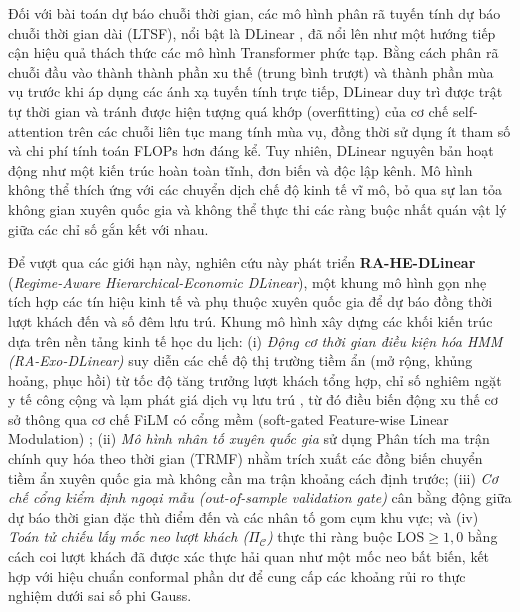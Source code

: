 \documentclass[10pt,journal,compsoc]{IEEEtran}
\begin{document}
Đối với bài toán dự báo chuỗi thời gian, các mô hình phân rã tuyến tính dự báo chuỗi thời gian dài (LTSF), nổi bật là DLinear \cite{zeng2023dlinear}, đã nổi lên như một hướng tiếp cận hiệu quả thách thức các mô hình Transformer phức tạp. Bằng cách phân rã chuỗi đầu vào thành thành phần xu thế (trung bình trượt) và thành phần mùa vụ trước khi áp dụng các ánh xạ tuyến tính trực tiếp, DLinear duy trì được trật tự thời gian và tránh được hiện tượng quá khớp (overfitting) của cơ chế self-attention trên các chuỗi liên tục mang tính mùa vụ, đồng thời sử dụng ít tham số và chi phí tính toán FLOPs hơn đáng kể. Tuy nhiên, DLinear nguyên bản hoạt động như một kiến trúc hoàn toàn tĩnh, đơn biến và độc lập kênh. Mô hình không thể thích ứng với các chuyển dịch chế độ kinh tế vĩ mô, bỏ qua sự lan tỏa không gian xuyên quốc gia và không thể thực thi các ràng buộc nhất quán vật lý giữa các chỉ số gắn kết với nhau.

Để vượt qua các giới hạn này, nghiên cứu này phát triển \textbf{RA-HE-DLinear} (\textit{Regime-Aware Hierarchical-Economic DLinear}), một khung mô hình gọn nhẹ tích hợp các tín hiệu kinh tế và phụ thuộc xuyên quốc gia để dự báo đồng thời lượt khách đến và số đêm lưu trú. Khung mô hình xây dựng các khối kiến trúc dựa trên nền tảng kinh tế học du lịch: (i) \textit{Động cơ thời gian điều kiện hóa HMM (RA-Exo-DLinear)} suy diễn các chế độ thị trường tiềm ẩn (mở rộng, khủng hoảng, phục hồi) từ tốc độ tăng trưởng lượt khách tổng hợp, chỉ số nghiêm ngặt y tế công cộng \cite{hale2021oxford} và lạm phát giá dịch vụ lưu trú \cite{eurostat_hicp_release}, từ đó điều biến động xu thế cơ sở thông qua cơ chế FiLM có cổng mềm (soft-gated Feature-wise Linear Modulation) \cite{perez2018film}; (ii) \textit{Mô hình nhân tố xuyên quốc gia} sử dụng Phân tích ma trận chính quy hóa theo thời gian (TRMF) \cite{yu2016trmf} nhằm trích xuất các đồng biến chuyển tiềm ẩn xuyên quốc gia mà không cần ma trận khoảng cách định trước; (iii) \textit{Cơ chế cổng kiểm định ngoại mẫu (out-of-sample validation gate)} cân bằng động giữa dự báo thời gian đặc thù điểm đến và các nhân tố gom cụm khu vực; và (iv) \textit{Toán tử chiếu lấy mốc neo lượt khách ($\Pi_{\mathcal{C}}$)} thực thi ràng buộc $\text{LOS} \ge 1{,}0$ bằng cách coi lượt khách đã được xác thực hải quan như một mốc neo bất biến, kết hợp với hiệu chuẩn conformal phần dư \cite{vovk2005algorithmic,angelopoulos2021conformal} để cung cấp các khoảng rủi ro thực nghiệm dưới sai số phi Gauss.
\end{document}
